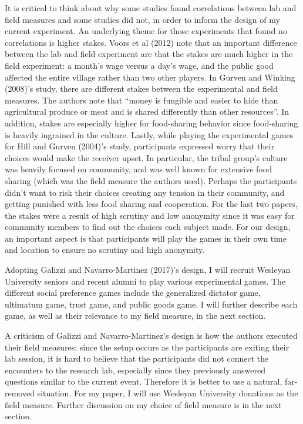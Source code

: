 \documentclass[12pt]{article}
\begin{document}
{\color{red}It is critical to think about why some studies found correlations between lab and field measures and some studies did not, in order to inform the design of my current experiment. An underlying theme for those experiments that found no correlations is higher stakes. Voors et al (2012) note that an important difference between the lab and field experiment are that the stakes are much higher in the field experiment: a month\rq s wage versus a day\rq s wage, and the public good affected the entire village rather than two other players. In Gurven and Winking (2008)\rq s study, there are different stakes between the experimental and field measures. The authors note that ``money is fungible and easier to hide than agricultural produce or meat and is shared differently than other resources''. In addition, stakes are especially higher for food-sharing behavior since food-sharing is heavily ingrained in the culture. Lastly, while playing the experimental games for Hill and Gurven (2004)\rq s study, participants expressed worry that their choices would make the receiver upset. In particular, the tribal group\rq s culture was heavily focused on community, and was well known for extensive food sharing (which was the field measure the authors used). Perhaps the participants didn\rq t want to risk their choices creating any tension in their community, and getting punished with less food sharing and cooperation. For the last two papers, the stakes were a result of high scrutiny and low anonymity since it was easy for community members to find out the choices each subject made. For our design, an important aspect is that participants will play the games in their own time and location to ensure no scrutiny and high anonymity. }

Adopting Galizzi and Navarro-Martinez (2017)'s design, I will recruit Wesleyan University seniors and recent alumni to play various experimental games.  The different social preference games include the generalized dictator game, ultimatum game, trust game, and public goods game. I will further describe each game, as well as their relevance to my field measure, in the next section.

A criticism of Galizzi and Navarro-Martinez\rq s design is how the authors executed their field measures: since the setup occurs as the participants are exiting their lab session, it is hard to believe that the participants did not connect the encounters to the research lab, especially since they previously answered questions similar to the current event. Therefore it is better to use a natural, far-removed situation. For my paper, I will use Wesleyan University donations as the field measure. Further discussion on my choice of field measure is in the next section.
\end{document}

